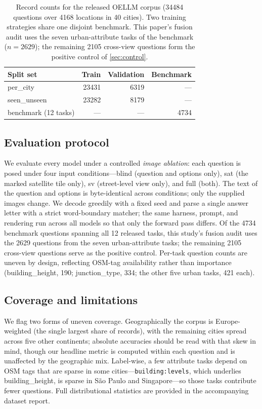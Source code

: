 \begin{table}[t]
  \centering
  \caption{Record counts for the released OELLM corpus (\num{34484} questions over
  \num{4168} locations in \num{40} cities). Two training strategies share one
  disjoint benchmark. This paper's fusion audit uses the seven urban-attribute
  tasks of the benchmark ($n=\num{2629}$); the remaining \num{2105} cross-view
  questions form the positive control of \cref{sec:control}.}
  \label{tab:dataset}
  \setlength{\tabcolsep}{8pt}
  \begin{tabular}{@{}lrrr@{}}
    \toprule
    Split set & Train & Validation & Benchmark \\
    \midrule
    per\_city    & \num{23431} & \num{6319} & --- \\
    seen\_unseen & \num{23282} & \num{8179} & --- \\
    benchmark (12 tasks) & --- & --- & \num{4734} \\
    \bottomrule
  \end{tabular}
\end{table}

\subsection{Evaluation protocol}
\label{sec:protocol}
We evaluate every model under a controlled \emph{image ablation}: each question is
posed under four input conditions---\textsf{blind} (question and options only),
\textsf{sat} (the marked satellite tile only), \textsf{sv} (street-level view only),
and \textsf{full} (both). The text of the question and options is byte-identical
across conditions; only the supplied images change. We decode greedily with a fixed
seed and parse a single answer letter with a strict word-boundary matcher; the same
harness, prompt, and rendering run across all models so that only the forward pass
differs. Of the \num{4734} benchmark questions spanning all \num{12} released tasks,
this study's fusion audit uses the \num{2629} questions from the seven
urban-attribute tasks; the remaining \num{2105} cross-view questions serve as the
positive control. Per-task question counts are uneven by design, reflecting OSM-tag
availability rather than importance (\textsf{building\_height}, \num{190};
\textsf{junction\_type}, \num{334}; the other five urban tasks, \num{421} each).

\subsection{Coverage and limitations}
\label{sec:coverage}
We flag two forms of uneven coverage. Geographically the corpus is Europe-weighted
(the single largest share of records), with the remaining cities spread across five
other continents; absolute accuracies should be read with that skew in mind, though
our headline metric is computed within each question and is unaffected by the
geographic mix. Label-wise, a few attribute tasks depend on OSM tags that are
sparse in some cities---\texttt{building:levels}, which underlies
\textsf{building\_height}, is sparse in São Paulo and Singapore---so those tasks
contribute fewer questions. Full distributional statistics are provided in the
accompanying dataset report.
